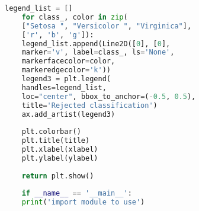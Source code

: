 \begin{lstlisting}[caption = contour.py, style=chstyle, language=Python]
	legend_list = []
	for class_, color in zip(
	["Setosa ", "Versicolor ", "Virginica"], 
	['r', 'b', 'g']):
	legend_list.append(Line2D([0], [0],
	marker='v', label=class_, ls='None',
	markerfacecolor=color,
	markeredgecolor='k'))
	legend3 = plt.legend(
	handles=legend_list,
	loc="center", bbox_to_anchor=(-0.5, 0.5),
	title='Rejected classification')
	ax.add_artist(legend3)
	
	plt.colorbar()
	plt.title(title)
	plt.xlabel(xlabel)
	plt.ylabel(ylabel)
	
	return plt.show()
	
	if __name__ == '__main__':
	print('import module to use')
	
\end{lstlisting}

\begin{comment}

\end{comment}


